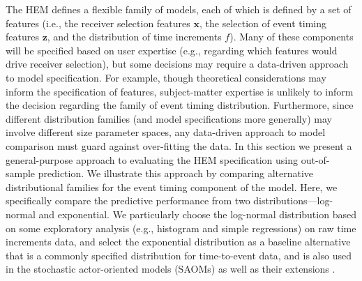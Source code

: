 \documentclass[ba]{imsart}
\numberwithin{equation}{section}
\theoremstyle{plain}
\begin{document}
	The HEM defines a flexible family of models, each of which is defined by a set of features (i.e., the receiver selection features $\boldsymbol{x}$, the selection of event timing features $\boldsymbol{z}$, and the distribution of time increments $f$). Many of these components will be specified based on user expertise (e.g., regarding which features would drive receiver selection), but some decisions may require a data-driven approach to model specification. For example, though theoretical considerations may inform the specification of features, subject-matter expertise is unlikely to inform the decision regarding the family of event timing distribution. Furthermore, since different distribution families (and model specifications more generally) may involve different size parameter spaces, any data-driven approach to model comparison must guard against over-fitting the data. In this section we present a general-purpose approach to evaluating the HEM specification using out-of-sample prediction. We illustrate this approach by comparing alternative distributional families for the event timing component of the model. Here, we specifically compare the predictive performance from two distributions---log-normal and exponential. We particularly choose the log-normal distribution based on some exploratory analysis (e.g., histogram and simple regressions) on raw time increments data, and select the exponential distribution as a baseline alternative that is a commonly specified distribution for time-to-event data, and is also used in the stochastic actor-oriented models (SAOMs) \citep{snijders1996stochastic} as well as their extensions \citep{snijders2007modeling}.
\end{document}

